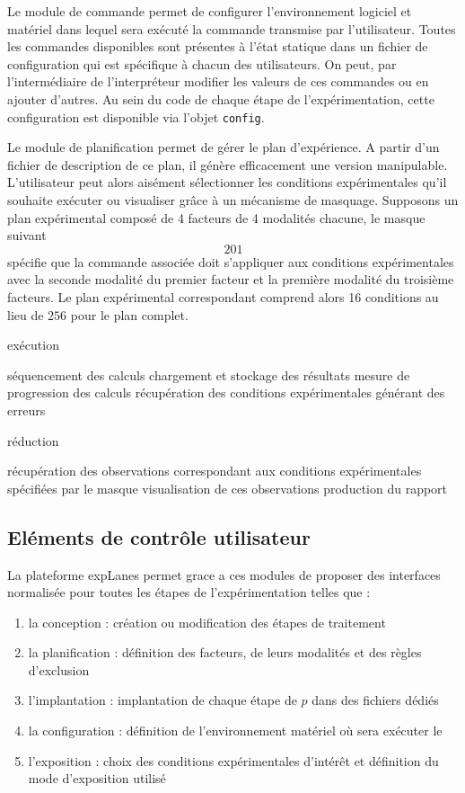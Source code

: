 Le module de commande permet de configurer l'environnement logiciel et matériel dans lequel sera exécuté la commande transmise par l'utilisateur. Toutes les commandes disponibles sont présentes à l'état statique dans un fichier de configuration qui est spécifique à chacun des utilisateurs. On peut, par l'intermédiaire de l'interpréteur modifier les valeurs de ces commandes ou en ajouter d'autres. Au sein du code de chaque étape de l'expérimentation, cette configuration est disponible via l'objet \texttt{config}.

Le module de planification permet de gérer le plan d'expérience. A partir d'un fichier de description de ce plan, il génère efficacement une version manipulable. L'utilisateur peut alors aisément sélectionner les conditions expérimentales qu'il souhaite exécuter ou visualiser grâce à un mécanisme de masquage. Supposons un plan expérimental composé de 4 facteurs de 4 modalités chacune, le masque suivant $${2 0 1}$$ spécifie que la commande associée doit s'appliquer aux conditions expérimentales avec la seconde modalité du premier facteur et la première modalité du troisième facteurs. Le plan expérimental correspondant comprend alors 16 conditions au lieu de  $256$ pour le plan complet.

exécution

séquencement des calculs
chargement et stockage des résultats
mesure de progression des calculs
récupération des conditions expérimentales générant des erreurs

réduction

récupération des observations correspondant aux conditions expérimentales spécifiées par le masque
visualisation de ces observations
production du rapport


\subsection{Eléments de contrôle utilisateur}

La plateforme expLanes permet grace a ces modules de proposer des interfaces normalisée pour toutes les étapes de l'expérimentation telles que :

\begin{enumerate}
  \item la conception : création ou modification des étapes de traitement
  \item la planification : définition des facteurs, de leurs modalités et des règles d'exclusion
  \item l'implantation : implantation de chaque étape de $p$ dans des fichiers dédiés
  \item la configuration : définition de l'environnement matériel où sera exécuter le
  \item l'exposition : choix des conditions expérimentales d'intérêt et définition du mode d'exposition utilisé
\end{enumerate}

